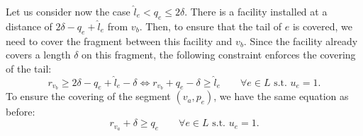 \documentclass[review]{elsarticle}
\newcommand{\st}{{\text{ s.t. }}}
\newcommand{\dlt}{{\delta}}
\theoremstyle{definition}
\begin{document}
Let us consider now the case $\hat l_{e} < q_{e} \le 2\dlt$.  There is a facility installed at a distance of $2\dlt - q_{e} + \hat l_e$ from $v_b$. Then, to ensure that the tail of $e$ is covered, we need to cover the fragment between this facility and $v_b$. Since the facility already covers a length $\dlt$ on this fragment, the following constraint enforces the covering of the tail:
  \begin{equation}
  \label{eq.cvu1}
  	r_{v_{b}}\ge 2\dlt  - q_{e}+ \hat l_{e}  -\dlt   \iff  r_{v_{b}}+q_{e} - \dlt \ge\hat l_{e}   \qquad\forall e \in L \st u_{e} =1.
  \end{equation}
To ensure the covering of the segment $(v_a,p_e)$, we have the same equation as before:
	\begin{equation}
 	r_{v_{a}}+\dlt \ge q_{e} \qquad  \forall e \in L \st u_{e} =1. \nonumber
  \end{equation}
\end{document}
